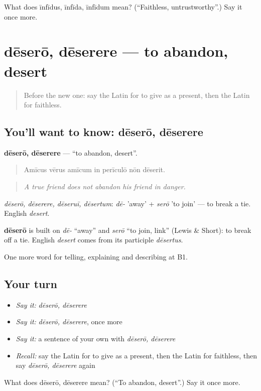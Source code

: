 \begin{tcolorbox}[breakable,colback=teal!4,colframe=teal!35!black,title={Before you move on}]
What does īnfīdus, īnfīda, īnfīdum mean? (\textquotedblleft{}Faithless, untrustworthy\textquotedblright{}.) Say it once more.
\end{tcolorbox}
\section[dēserō, dēserere]{dēserō, dēserere — to abandon, desert}

\label{lesson:LA-C537-desero}



\begin{quote}
Before the new one: say the Latin for to give as a present, then the Latin for faithless.
\end{quote}

\subsection*{You'll want to know: dēserō, dēserere}
\textbf{dēserō, dēserere} — \textquotedblleft{}to abandon, desert\textquotedblright{}.

\begin{quote}
Amīcus vērus amīcum in perīculō nōn dēserit.
\end{quote}

\begin{quote}
\emph{A true friend does not abandon his friend in danger.}
\end{quote}

\emph{dēserō, dēserere, dēseruī, dēsertum}: \emph{dē-} 'away' + \emph{serō} 'to join' — to break a tie. English \emph{desert}.

\begin{cousinweb}
\textbf{dēserō} is built on \emph{dē-} \textquotedblleft{}away\textquotedblright{} and \emph{serō} \textquotedblleft{}to join, link\textquotedblright{} (Lewis \& Short): to break off a tie. English \emph{desert} comes from its participle \emph{dēsertus}.
\end{cousinweb}

\begin{grammarlens}[title={What you've built}]
One more word for telling, explaining and describing at B1.
\end{grammarlens}

\subsection*{Your turn}
\begin{itemize}
\raggedright
  \item \emph{Say it:} \emph{dēserō, dēserere}
  \item \emph{Say it:} \emph{dēserō, dēserere}, once more
  \item \emph{Say it:} a sentence of your own with \emph{dēserō, dēserere}
  \item \emph{Recall:} say the Latin for to give as a present, then the Latin for faithless, then say \emph{dēserō, dēserere} again
\end{itemize}

\begin{tcolorbox}[breakable,colback=teal!4,colframe=teal!35!black,title={Before you move on}]
What does dēserō, dēserere mean? (\textquotedblleft{}To abandon, desert\textquotedblright{}.) Say it once more.
\end{tcolorbox}
